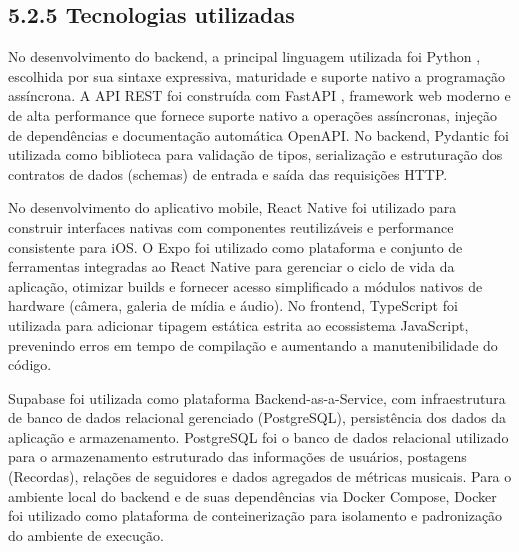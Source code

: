 \hypertarget{__RefHeading___Toc4841_3118176633}{}
\subsection*{5.2.5 Tecnologias utilizadas}
\label{ages-iv:text-h-0113}

No desenvolvimento do backend, a principal linguagem utilizada foi Python \cite{ages-iv-python}, escolhida por sua sintaxe expressiva, maturidade e suporte nativo a programação assíncrona. A API REST foi construída com FastAPI \cite{ages-iv-fastapi}, framework web moderno e de alta performance que fornece suporte nativo a operações assíncronas, injeção de dependências e documentação automática OpenAPI. No backend, Pydantic \cite{ages-iv-pydantic} foi utilizada como biblioteca para validação de tipos, serialização e estruturação dos contratos de dados (schemas) de entrada e saída das requisições HTTP.\par

No desenvolvimento do aplicativo mobile, React Native \cite{ages-iv-react-native} foi utilizado para construir interfaces nativas com componentes reutilizáveis e performance consistente para iOS. O Expo \cite{ages-iv-expo} foi utilizado como plataforma e conjunto de ferramentas integradas ao React Native para gerenciar o ciclo de vida da aplicação, otimizar builds e fornecer acesso simplificado a módulos nativos de hardware (câmera, galeria de mídia e áudio). No frontend, TypeScript \cite{ages-iv-typescript} foi utilizada para adicionar tipagem estática estrita ao ecossistema JavaScript, prevenindo erros em tempo de compilação e aumentando a manutenibilidade do código.\par

Supabase \cite{ages-iv-supabase} foi utilizada como plataforma Backend-as-a-Service, com infraestrutura de banco de dados relacional gerenciado (PostgreSQL), persistência dos dados da aplicação e armazenamento. PostgreSQL \cite{ages-iv-postgresql} foi o banco de dados relacional utilizado para o armazenamento estruturado das informações de usuários, postagens (Recordas), relações de seguidores e dados agregados de métricas musicais. Para o ambiente local do backend e de suas dependências via Docker Compose, Docker \cite{ages-iv-docker} foi utilizado como plataforma de conteinerização para isolamento e padronização do ambiente de execução.\par

